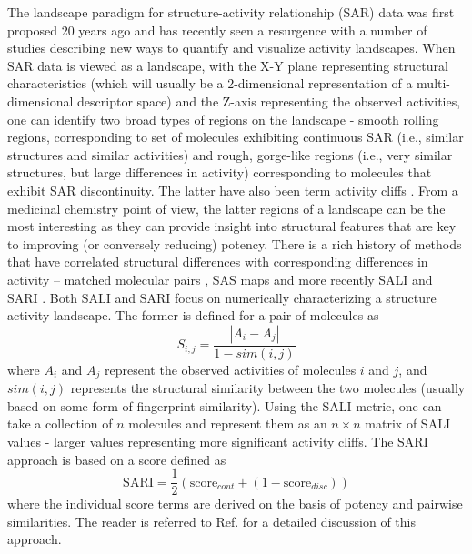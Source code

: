 \documentclass[letterpaper, 12pt]{article}
\begin{document}
The landscape paradigm for structure-activity relationship (SAR) data was first proposed 20 years
ago \cite{Johnson:1990ys} and has recently seen a resurgence with a number of studies describing new
ways to quantify and visualize activity landscapes. When SAR data is viewed as a landscape, with the
X-Y plane representing structural characteristics (which will usually be a 2-dimensional
representation of a multi-dimensional descriptor space) and the Z-axis representing the observed
activities, one can identify two broad types of regions on the landscape - smooth rolling regions,
corresponding to set of molecules exhibiting continuous SAR (i.e., similar structures and similar
activities) and rough, gorge-like regions (i.e., very similar structures, but large differences in
activity) corresponding to molecules that exhibit SAR discontinuity. The latter have also been term
activity cliffs \cite{Maggiora:2006aa}. From a medicinal chemistry point of view, the latter regions
of a landscape can be the most interesting as they can provide insight into structural features that
are key to improving (or conversely reducing) potency. There is a rich history of methods that have
correlated structural differences with corresponding differences in activity -- matched molecular
pairs \cite{Leach:2006aa}, SAS maps \cite{Maggiora:2011kx} and more recently SALI \cite{Guha:2008aa}
and SARI \cite{Peltason:2007aa}. Both SALI and SARI focus on numerically characterizing a structure
activity landscape. The former is defined for a pair of molecules as
\begin{equation}
  \label{eq:1}
  S_{i,j} = \frac{|A_i - A_j|}{1 - sim(i,j)}
\end{equation}
where $A_i$ and $A_j$ represent the observed activities of molecules $i$ and $j$, and $sim(i,j)$
represents the structural similarity between the two molecules (usually based on some form of
fingerprint similarity). Using the SALI metric, one can take a collection of $n$ molecules and
represent them as an $n \times n$ matrix of SALI values - larger values representing more
significant activity cliffs. The SARI approach is based on a score defined as
\begin{equation}
  \label{eq:2}
  \mathrm{SARI} = \frac{1}{2} \left(\mathrm{score}_{cont} + (1 -
    \mathrm{score}_{disc}) \right)
\end{equation}
where the individual score terms are derived on the basis of potency and pairwise similarities. The
reader is referred to Ref.  for a detailed discussion of this approach.
\end{document}
